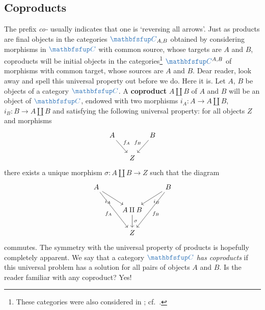 \subsection{Coproducts}%
\label{subsec:prelims:coproducts}
The prefix \emph{co-} usually indicates that one is `reversing all
arrows'.  Just as products are final objects in the categories
$\categ{C}_{A,B}$ obtained by considering morphisms in $\categ{C}$
with common source, whose targets are $A$ and $B$, coproducts will be
initial objects in the categories\footnote{These categories were also
  considered in ; cf.\
  .} $\categ{C}^{A,B}$ of morphisms
with common target, whose sources are $A$ and $B$. Dear reader, look
away and spell this universal property out before we do.  Here it
is. Let $A$, $B$ be objects of a category $\categ{C}$. A
\textbf{coproduct} $A \amalg B$ of $A$ and $B$ will be an object of
$\categ{C}$, endowed with two morphisms $i_A \colon A \to A \amalg B$,
$i_B \colon B \to A \amalg B$ and satisfying the following universal
property: for all objects $Z$ and morphisms
\[
  \begin{tikzcd}[column sep=small]
    A \arrow[dr, "f_A"] & & B \arrow[dl, "f_B"'] \\
    & Z &
  \end{tikzcd}
\]
there exists a unique morphism $\sigma \colon A \amalg B \to Z$ such
that the diagram
\[
  \begin{tikzcd}
    A \arrow[dr, "i_A"'] \arrow[ddr, "f_A"'] & & B \arrow[dl, "i_B"] \arrow[ddl, "f_B"] \\
    & A \amalg B \arrow[d, "\sigma"] & \\
    & Z &
  \end{tikzcd}
\]
commutes. The symmetry with the universal property of products is
hopefully completely apparent. We say that a category $\categ{C}$
\emph{has coproducts} if this universal problem has a solution for all
pairs of objects $A$ and $B$.  Is the reader familiar with any
coproduct? Yes!

